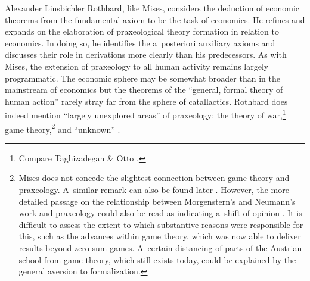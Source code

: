 \begin{artengenv}{Alexander Linsbichler}
Rothbard, like Mises, considers the deduction of economic theorems from the fundamental axiom to be the task of economics. He refines and expands on the elaboration of praxeological theory formation in relation to economics. In doing so, he identifies the a~posteriori auxiliary axioms and discusses their role in derivations more clearly than his predecessors. As with Mises, the extension of praxeology to all human activity remains largely programmatic. The economic sphere may be somewhat broader than in the mainstream of economics but the theorems of the ``general, formal theory of human action'' 
\parencite[][p.945]{rothbard_praxeology_1951} %
 rarely stray far from the sphere of catallactics. Rothbard does indeed mention ``largely unexplored areas'' of praxeology: the theory of war,\footnote{Compare Taghizadegan \& Otto 
\parencite*[][]{taghizadegan_praxeology_2015}.%
} game theory,\footnote{Mises 
\parencite*[][pp.116–117]{mises_human_1998} %
 does not concede the slightest connection between game theory and praxeology. A~similar remark can also be found later 
\parencite[][p.135]{mises_ultimate_2012}. %
 However, the more detailed passage on the relationship between Morgenstern's and Neumann's work and praxeology could also be read as indicating a~shift of opinion 
\parencite[][pp.89–90]{mises_ultimate_2012}. %
 It is difficult to assess the extent to which substantive reasons were responsible for this, such as the advances within game theory, which was now able to deliver results beyond zero-sum games. A~certain distancing of parts of the Austrian school from game theory, which still exists today, could be explained by the general aversion to formalization.} and ``unknown'' 
\parencite[][p.946]{rothbard_praxeology_1951}.%





\end{artengenv}
